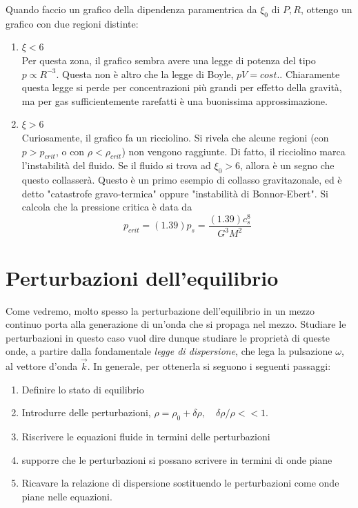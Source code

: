 \documentclass{report}
\begin{document}
    Quando faccio un grafico della dipendenza paramentrica da $\xi_0$ di $P, R$, ottengo un grafico con due regioni distinte: 
    \begin{enumerate}
        \item $\xi < 6$ \\
        Per questa zona, il grafico sembra avere una legge di potenza del tipo $p \propto R^{-3}$. Questa non è altro che la legge di Boyle, $pV = cost. $. Chiaramente questa legge si perde per concentrazioni più grandi per effetto della gravità, ma per gas sufficientemente rarefatti è una buonissima approssimazione. 
        \item $\xi > 6$\\
        Curiosamente, il grafico fa un ricciolino. Si rivela che alcune regioni (con $p> p_{crit}$, o con $\rho < \rho_{crit}$) non vengono raggiunte. Di fatto, il ricciolino marca l'instabilità del fluido. Se il fluido si trova ad $\xi_0 > 6$, allora è un segno che questo collasserà. Questo è un primo esempio di collasso gravitazonale, ed è detto "catastrofe gravo-termica" oppure "instabilità di Bonnor-Ebert". Si calcola che la pressione critica è data da 
        \begin{equation}
            p_{crit} = (1.39)p_s = \frac{(1.39)c_s^8}{G^3M^2} 
        \end{equation}
    \end{enumerate}


\newpage

\chapter{Perturbazioni dell'equilibrio}

Come vedremo, molto spesso la perturbazione dell'equilibrio in un mezzo continuo porta alla generazione di un'onda che si propaga nel mezzo. Studiare le perturbazioni in questo caso vuol dire dunque studiare le proprietà di queste onde, a partire dalla fondamentale \emph{legge di dispersione}, che lega la pulsazione $\omega$, al vettore d'onda $\vec{k}$. In generale, per ottenerla si seguono i seguenti passaggi: 

\begin{enumerate}
    \item Definire lo stato di equilibrio
    \item Introdurre delle perturbazioni, $\rho = \rho_0 + \delta\rho, \quad \delta\rho/\rho <<1$. 
    \item Riscrivere le equazioni fluide in termini delle perturbazioni
    \item supporre che le perturbazioni si possano scrivere in termini di onde piane
    \item Ricavare la relazione di dispersione sostituendo le perturbazioni come onde piane nelle equazioni. 
\end{enumerate}
\end{document}
